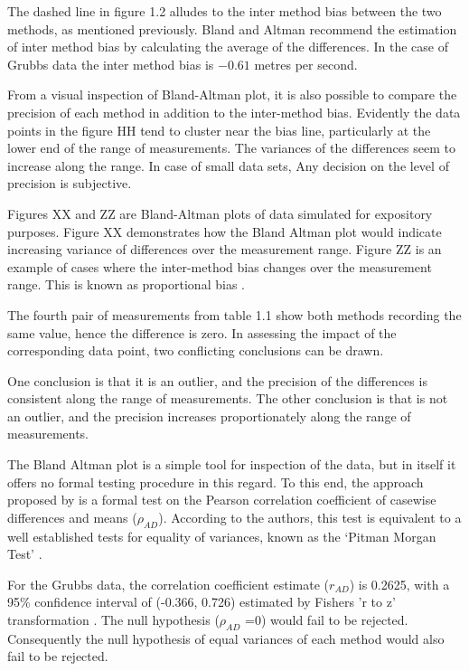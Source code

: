 \documentclass[Chap2main.tex]{subfiles}
\begin{document}
	The dashed line in figure 1.2 alludes to the inter method bias
	between the two methods, as mentioned previously. Bland and Altman
	recommend the estimation of inter method bias by calculating the
	average of the differences. In the case of Grubbs data the inter
	method bias is $-0.61$ metres per second.
	
	
	From a visual inspection of Bland-Altman plot, it is also possible
	to compare the precision of each method in addition to the
	inter-method bias.  Evidently the data points in the figure HH
	tend to cluster near the bias line, particularly at the lower end
	of the range of measurements. The variances of the differences
	seem to increase along the range. In case of small data sets, Any
	decision on the level of precision is subjective.
	
	Figures XX and ZZ are Bland-Altman plots of data simulated for
	expository purposes. Figure XX demonstrates how the Bland Altman
	plot would indicate increasing variance of differences over the
	measurement range. Figure ZZ is an example of cases where the
	inter-method bias changes over the measurement range. This is
	known as proportional bias \citep{ludbrook97}.
	
	
	
	
	The fourth pair of measurements from table 1.1 show both methods
	recording the same value, hence the difference is zero. In
	assessing the impact of the corresponding data point, two
	conflicting conclusions can be drawn.
	
	One conclusion is that it is an outlier, and the precision of the
	differences is consistent along the range of measurements. The
	other conclusion is that is not an outlier, and the precision
	increases proportionately along the range of measurements.
	
	The Bland Altman plot is a simple tool for inspection of the data,
	but in itself it offers no formal testing procedure in this
	regard. To this end, the approach proposed by \citet{BA83} is a
	formal test on the Pearson correlation coefficient  of casewise
	differences and means ($\rho_{AD}$). According to the authors,
	this test is equivalent to a well established tests for equality
	of variances, known as the `Pitman Morgan Test' \citep{Pitman,
		Morgan}.
	
	For the Grubbs data, the correlation coefficient estimate
	($r_{AD}$) is 0.2625, with a 95\% confidence interval of (-0.366,
	0.726) estimated by Fishers 'r to z' transformation \citep{Cohen}.
	The null hypothesis ($\rho_{AD}$ =0) would fail to be rejected.
	Consequently the null hypothesis of equal variances of each method
	would also fail to be rejected.
	
\end{document}
